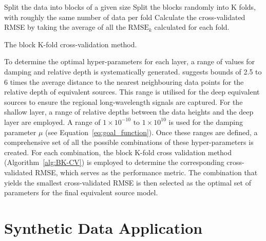 \begin{algorithm}[!h]
    Split the data into blocks of a given size
    \;
    Split the blocks randomly into K folds, with roughly the same number of data per fold
    \;
    Calculate the cross-validated RMSE by taking the average of all the $\text{RMSE}_k$ calculated for each fold.
    \BlankLine
    \caption{The block K-fold cross-validation method.}
    \label{alg:BK-CV}
\end{algorithm}

To determine the optimal hyper-parameters for each layer, a range of values for damping and relative depth is systematically generated. \citet{Dampney1969} suggests bounds of 2.5 to 6 times the average distance to the nearest neighbouring data points for the relative depth of equivalent sources. This range is utilised for the deep equivalent sources to ensure the regional long-wavelength signals are captured. For the shallow layer, a range of relative depths between the data heights and the deep layer are employed. A range of $1 \times 10^{-10} \text{ to } 1 \times 10^{10}$ is used for the damping parameter $\mu$ (see Equation~\ref{eq:goal_function}). Once these ranges are defined, a comprehensive set of all the possible combinations of these hyper-parameters is created. For each combination, the block K-fold cross validation method (Algorithm~\ref{alg:BK-CV}) is employed to determine the corresponding cross-validated RMSE, which serves as the performance metric. The combination that yields the smallest cross-validated RMSE is then selected as the optimal set of parameters for the final equivalent source model.


\section{Synthetic Data Application}

